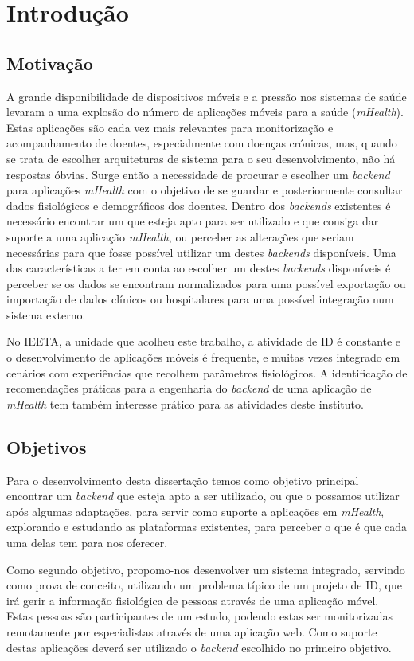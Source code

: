 \chapter{Introdu\c c\~ao}

\section{Motivação}

A grande disponibilidade de dispositivos móveis e a pressão nos sistemas de saúde levaram a uma explosão do número de aplicações móveis para a saúde (\textit{mHealth}). Estas aplicações são cada vez mais relevantes para monitorização e acompanhamento de doentes, especialmente com doenças crónicas\cite{mHealth-chronic-disease}, mas, quando se trata de escolher arquiteturas de sistema para o seu desenvolvimento, não há respostas óbvias. Surge então a necessidade de procurar e escolher um \textit{backend} para aplicações \textit{mHealth} com o objetivo de se guardar e posteriormente consultar dados fisiológicos e demográficos dos doentes.
Dentro dos \textit{backends} existentes é necessário encontrar um que esteja apto para ser utilizado e que consiga dar suporte a uma aplicação \textit{mHealth}, ou perceber as alterações que seriam necessárias para que fosse possível utilizar um destes \textit{backends} disponíveis. Uma das características a ter em conta ao escolher um destes \textit{backends} disponíveis é perceber se os dados se encontram normalizados para uma possível exportação ou importação de dados clínicos ou hospitalares para uma possível integração num sistema externo. \par
No \gls{IEETA}, a unidade que acolheu este trabalho, a atividade de \gls{ID} é constante e o desenvolvimento de aplicações móveis é frequente, e muitas vezes integrado em cenários com experiências que recolhem parâmetros fisiológicos. A identificação de recomendações práticas para a engenharia do \textit{backend} de uma aplicação de \textit{mHealth} tem também interesse prático para as atividades deste instituto.

\section{Objetivos}
Para o desenvolvimento desta dissertação temos como objetivo principal encontrar um \textit{backend} que esteja apto a ser utilizado, ou que o possamos utilizar após algumas adaptações, para servir como suporte a aplicações em \textit{mHealth}, explorando e estudando as plataformas existentes, para perceber o que é que cada uma delas tem para nos oferecer. \par
Como segundo objetivo, propomo-nos desenvolver um sistema integrado, servindo como prova de conceito, utilizando um problema típico de um projeto de \gls{ID}, que irá gerir a informação fisiológica de pessoas através de uma aplicação móvel. Estas pessoas são participantes de um estudo, podendo estas ser monitorizadas remotamente por especialistas através de uma aplicação web. Como suporte destas aplicações deverá ser utilizado o \textit{backend} escolhido no primeiro objetivo.

